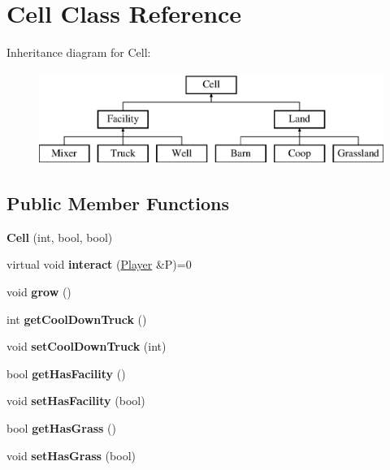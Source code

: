 \hypertarget{class_cell}{}\section{Cell Class Reference}
\label{class_cell}
Inheritance diagram for Cell\+:\begin{figure}[H]
\begin{center}
\leavevmode
\includegraphics[height=3.000000cm]{class_cell}
\end{center}
\end{figure}
\subsection*{Public Member Functions}
\begin{DoxyCompactItemize}
\item 
\mbox{\label{class_cell_a3f9499be93a51592277a4cc62935ac41}} 
{\bfseries Cell} (int, bool, bool)
\item 
\mbox{\label{class_cell_aa16137b7f051c6dbc4bae83651e566c8}} 
virtual void {\bfseries interact} (\mbox{\hyperlink{class_player}{Player}} \&P)=0
\item 
\mbox{\label{class_cell_ab6bd7f823145835ab4444c70a87c7f77}} 
void {\bfseries grow} ()
\item 
\mbox{\label{class_cell_aec3da53cc3034c7ef000d3b1cf7262f6}} 
int {\bfseries get\+Cool\+Down\+Truck} ()
\item 
\mbox{\label{class_cell_ae689acf3461b91a14bddb6bb727fce7c}} 
void {\bfseries set\+Cool\+Down\+Truck} (int)
\item 
\mbox{\label{class_cell_addba162356d07853e6c0a5bc2df2975e}} 
bool {\bfseries get\+Has\+Facility} ()
\item 
\mbox{\label{class_cell_acb06da58e30e96d1758fc6d9b7bcbef4}} 
void {\bfseries set\+Has\+Facility} (bool)
\item 
\mbox{\label{class_cell_a7b576dba25bfcc295caa17396e29b6ca}} 
bool {\bfseries get\+Has\+Grass} ()
\item 
\mbox{\label{class_cell_a22fc890271b8cc6df750bcf777d597ac}} 
void {\bfseries set\+Has\+Grass} (bool)
\end{DoxyCompactItemize}

